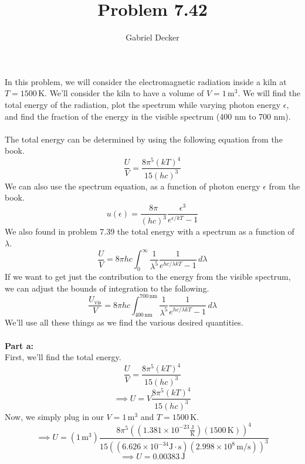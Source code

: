 \documentclass[12pt]{article}
\title{Problem 7.42}
\author{Gabriel Decker}
\newcommand{\boltzmannConstK}{1.381\times10^{-23}\frac{\text{J}}{\text{K}}}
\newcommand{\planckConst}{6.626\times10^{-34}\text{J}\cdot\text{s}}
\begin{document}
\maketitle
\begin{flushleft}


In this problem, we will consider the electromagnetic radiation inside a kiln at $T=1500\,\text{K}$.
We'll consider the kiln to have a volume of $V=1\,\text{m}^3$.
We will find the total energy of the radiation, plot the spectrum while varying photon energy $\epsilon$, and find the fraction of the energy in the visible spectrum (400 nm to 700 nm).\\~\\

The total energy can be determined by using the following equation from the book.
\begin{equation}
    \frac{U}{V}=\frac{8\pi^5(kT)^4}{15(hc)^3}
\end{equation}
We can also use the spectrum equation, as a function of photon energy $\epsilon$ from the book.
\begin{equation}
    u(\epsilon)=\frac{8\pi}{(hc)^3}\frac{\epsilon^3}{e^{\epsilon/kT}-1}
\end{equation}
We also found in problem 7.39 the total energy with a spectrum as a function of $\lambda$.
\begin{equation}
    \frac{U}{V}=8\pi hc\int_0^\infty\frac{1}{\lambda^5}\frac{1}{e^{hc/\lambda kT}-1}\,d\lambda
\end{equation}
If we want to get just the contribution to the energy from the visible spectrum, we can adjust the bounds of integration to the following.
\begin{equation}
    \frac{U_\text{vis}}{V}=8\pi hc\int_{400\,\text{nm}}^{700\,\text{nm}}\frac{1}{\lambda^5}\frac{1}{e^{hc/\lambda kT}-1}\,d\lambda
\end{equation}
We'll use all these things as we find the various desired quantities.\\~\\


\textbf{Part a:}\\
First, we'll find the total energy.
$$\frac{U}{V}=\frac{8\pi^5(kT)^4}{15(hc)^3}$$
$$\implies U=V\frac{8\pi^5(kT)^4}{15(hc)^3}$$
Now, we simply plug in our $V=1\,\text{m}^3$ and $T=1500\,\text{K}$.
$$\implies U=(1\,\text{m}^3)\frac{8\pi^5((\boltzmannConstK)(1500\,\text{K}))^4}{15((\planckConst)(2.998\times10^8\,\text{m/s}))^3}$$
$$\implies U=0.00383\,\text{J}$$\\~\\~\\




\end{flushleft}
\end{document}
